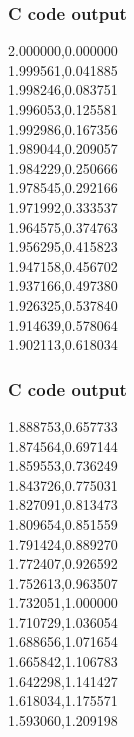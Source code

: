 \documentclass{beamer}
\begin{document}
\begin{frame}
\frametitle{C code output}
2.000000,0.000000\\
1.999561,0.041885\\
1.998246,0.083751\\
1.996053,0.125581\\
1.992986,0.167356\\
1.989044,0.209057\\
1.984229,0.250666\\
1.978545,0.292166\\
1.971992,0.333537\\
1.964575,0.374763\\
1.956295,0.415823\\
1.947158,0.456702\\
1.937166,0.497380\\
1.926325,0.537840\\
1.914639,0.578064\\
1.902113,0.618034\\

\end{frame}

\begin{frame}
\frametitle{C code output}
1.888753,0.657733\\
1.874564,0.697144\\
1.859553,0.736249\\
1.843726,0.775031\\
1.827091,0.813473\\
1.809654,0.851559\\
1.791424,0.889270\\
1.772407,0.926592\\
1.752613,0.963507\\
1.732051,1.000000\\
1.710729,1.036054\\
1.688656,1.071654\\
1.665842,1.106783\\
1.642298,1.141427\\
1.618034,1.175571\\
1.593060,1.209198\\

\end{frame}
\end{document}
